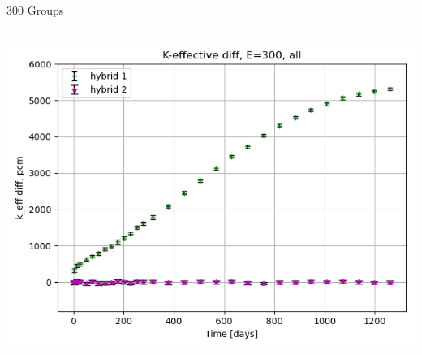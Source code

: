 \documentclass[
	11pt, %
	aspectratio=169, %
]{beamer}
\begin{document}
\begin{frame}{300 Groups}
\begin{columns}[c]
\begin{column}{0.32\textwidth}
			\includegraphics[width=\textwidth]{../figures/keff/keff_all_300_diff.png}
		\end{column}
	\end{columns}
\end{frame}
\end{document}
